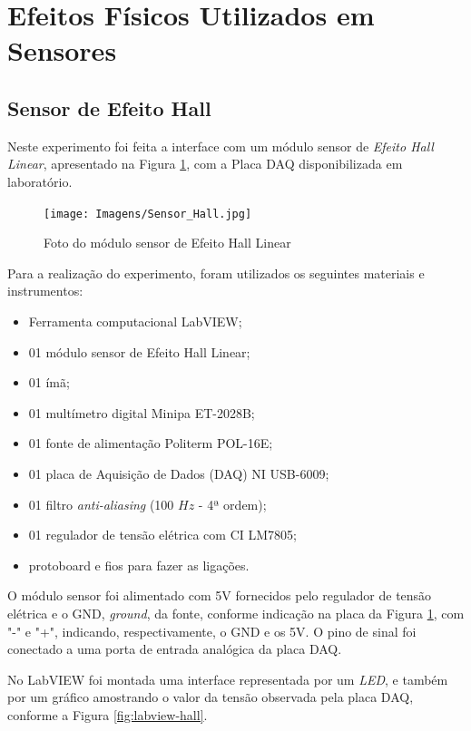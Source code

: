 \documentclass[a4paper]{instrumentacao}
\begin{document}
\section{Efeitos Físicos Utilizados em Sensores}

\subsection{Sensor de Efeito Hall}
Neste experimento foi feita a interface com um módulo sensor de \textit{Efeito Hall Linear}, apresentado na Figura \ref{fig:efeito-hall}, com a Placa DAQ disponibilizada em laboratório.

\begin{figure}[H]
\centering
\texttt{[image: Imagens/Sensor\_Hall.jpg]}
\caption{Foto do módulo sensor de Efeito Hall Linear}
\label{fig:efeito-hall}
\end{figure}

Para a realização do experimento, foram utilizados os seguintes materiais e instrumentos:

\begin{itemize}
	\item Ferramenta computacional LabVIEW;
	\item 01 módulo sensor de Efeito Hall Linear;
	\item 01 ímã;
	\item 01 multímetro digital Minipa ET-2028B;
	\item 01 fonte de alimentação Politerm POL-16E;
	\item 01 placa de Aquisição de Dados (DAQ) NI  USB-6009;
	\item 01 filtro \textit{anti-aliasing} (100 $Hz$ - 4ª ordem);
	\item 01 regulador de tensão elétrica com CI LM7805;
	\item protoboard e fios para fazer as ligações. 
\end{itemize}

O módulo sensor foi alimentado com 5V fornecidos pelo regulador de tensão elétrica e o GND, \textit{ground}, da fonte, conforme indicação na placa da Figura \ref{fig:efeito-hall}, com "-" e "+", indicando, respectivamente, o GND e os 5V. O pino de sinal foi conectado a uma porta de entrada analógica da placa DAQ.

No LabVIEW foi montada uma interface representada por um \textit{LED}, e também por um gráfico amostrando o valor da tensão observada pela placa DAQ, conforme a Figura \ref{fig:labview-hall}.
\end{document}

